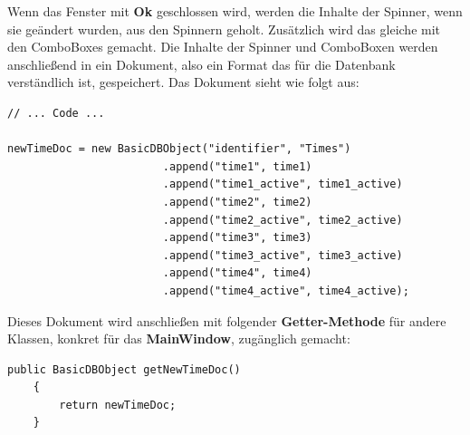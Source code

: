 Wenn das Fenster mit \textbf{Ok} geschlossen wird, werden die Inhalte der Spinner, wenn sie geändert wurden, aus den Spinnern geholt. Zusätzlich wird das gleiche mit den ComboBoxes gemacht. Die Inhalte der Spinner und ComboBoxen werden anschließend in ein Dokument, also ein Format das für die Datenbank verständlich ist, gespeichert. Das Dokument sieht wie folgt aus:
\begin{lstlisting}[style=Javastyle, caption=Zeitendokument]
// ... Code ...

newTimeDoc = new BasicDBObject("identifier", "Times")
                        .append("time1", time1)
                        .append("time1_active", time1_active)
                        .append("time2", time2)
                        .append("time2_active", time2_active)
                        .append("time3", time3)
                        .append("time3_active", time3_active)
                        .append("time4", time4)
                        .append("time4_active", time4_active);
\end{lstlisting}
Dieses Dokument wird anschließen mit folgender \textbf{Getter-Methode} für andere Klassen, konkret für das \textbf{MainWindow}, zugänglich gemacht:
\begin{lstlisting}[style=Javastyle, caption=Zeitendokument Getter-Methode]
public BasicDBObject getNewTimeDoc()
    {
        return newTimeDoc;
    }
\end{lstlisting}

\newpage


